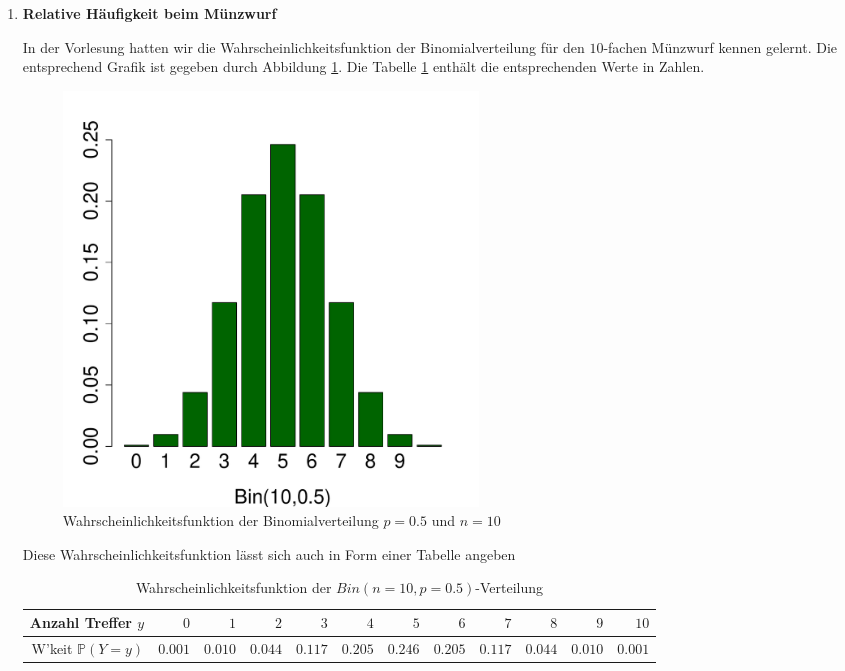 \documentclass[11pt]{article}
\newcommand{\startwert}{0}
\newcommand{\aufgabe}[1]{\item{\bf #1}}
\begin{document}
\begin{enumerate}\addtocounter{enumi}{\startwert}






\aufgabe{Relative Häufigkeit beim Münzwurf}

In der Vorlesung hatten wir die Wahrscheinlichkeitsfunktion der Binomialverteilung für den
$10$-fachen Münzwurf kennen gelernt. Die entsprechend Grafik ist gegeben durch
Abbildung \ref{abb1}. Die Tabelle \ref{tab1} enthält die entsprechenden Werte in Zahlen.

 \begin{figure}[ht]
 	\centering
 	      \includegraphics[width=0.55\textwidth]{muenze.pdf}
 	      \caption{Wahrscheinlichkeitsfunktion der Binomialverteilung $p=0.5$ und $n=10$
 	       \label{abb1}}
 	\end{figure}
 	
 	Diese Wahrscheinlichkeitsfunktion  lässt sich auch in Form einer Tabelle angeben
 	 \begin{table}[h]
 \centering 
 \small
\begin{tabular}{|r|r|r|r|r|r|r|r|r|r|r|r|}
  \hline
   Anzahl Treffer  $y$                               & $0$    &   $1$    & $2$   & $3$   & $4$   & $5$ &   $6$    & $7$   & $8$   & $9$   & $10$\\ \hline
   W'keit $\mathbb{P}(Y=y)$ & $0.001$ & $0.010$ & $0.044$ & $0.117$ & $0.205$ & $0.246$ & $0.205$ & $0.117$ & $0.044$ & $0.010$ & $0.001$  \\ \hline
\end{tabular}
 \caption{Wahrscheinlichkeitsfunktion der $Bin(n=10,p=0.5)$-Verteilung \label{tab1}}
 \end{table}  



\end{enumerate}
\end{document}
